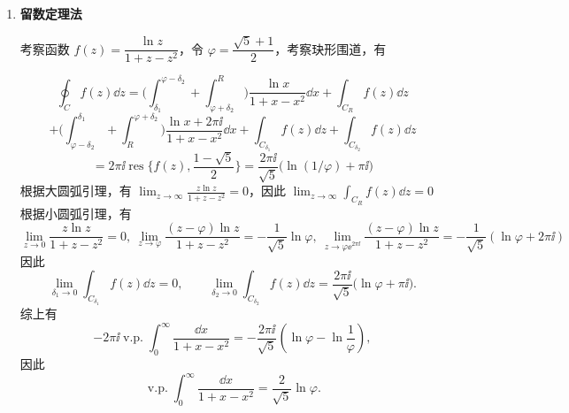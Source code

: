 \begin{question}
\begin{solution}
\begin{enumerate}
有 \(\displaystyle\lim_{z\to\infty} z f(z)=0,\ \lim_{z\to0} z f(z)=0\)，因此有 \[ \int_0^\infty \frac{x^m}{(x+a)(x+b)}\dd{x}=\frac{\pi}{\sin\pi m} \frac{a^m-b^m}{a-b} \]
最后可以得到 \[ \pdv{^2}{m^2}\int_0^\infty \frac{x^m}{(x+a)(x+b)}\dd{x}=\int_0^\infty \frac{(\ln x)^2 x^m}{(x+a)(x+b)}\dd{x} \] \[ =\frac{\pi\csc(m\pi)}{a-b} \biggl[(a^m - b^m) \pi^2 (\cot^2(m\pi) + \csc^2(m\pi)) \] \[ + a^m (\ln a)^2 - b^m (\ln b)^2 - 2\pi\cot(m\pi) (a^m \ln a - b^m \ln b)\biggr] \]
取 \(m\to0\)，有 \[ \int_0^\infty \frac{(\ln x)^2}{(x+a)(x+b)}\dd{x}=\frac{\pi^2 \ln\frac{b}{a}-(\ln a)^3+(\ln b)^3}{3(b-a)} \]

  \item
\textbf{留数定理法}\par

考察函数 \(f(z) = \dfrac{\ln z}{1+z-z^2}\)，令 \(\varphi=\dfrac{\sqrt5+1}{2}\)，考察玦形围道，有
\begin{center}
\end{center}

\[ \oint_C f(z)\dd{z} =\biggl(\int_{\delta_1}^{\varphi-\delta_2}+\int_{\varphi+\delta_2}^{R}\biggr) \frac{\ln x}{1+x-x^2}\dd{x} + \int_{C_R} f(z)\dd{z} \] \[ +\biggl(\int_{\varphi-\delta_2}^{\delta_1}+\int_{R}^{\varphi+\delta_2}\biggr) \frac{\ln x + 2\pi\ii}{1+x-x^2}\dd{x} +\int_{C_{\delta_1}} f(z)\dd{z} + \int_{C_{\delta_2}} f(z)\dd{z} \] \[ = 2\pi\ii \operatorname{res}\biggl\{f(z),\frac{1-\sqrt5}{2}\biggr\}= \frac{2\pi\ii}{\sqrt5} \bigl(\ln (1/\varphi)+\pi\ii\bigr) \]
根据大圆弧引理，有 \(\displaystyle\lim_{z\to\infty} \frac{z\ln z}{1+z-z^2}=0\)，因此 \(\displaystyle \lim_{z\to\infty} \int_{C_R} f(z)\dd{z}= 0\)
根据小圆弧引理，有 \[ \lim_{z\to0} \frac{z\ln z}{1+z-z^2}=0,\ \lim_{z\to\varphi} \frac{(z-\varphi)\ln z}{1+z-z^2}=-\frac1{\sqrt5}\ln\varphi,\ \lim_{z\to\varphi \ee^{2\pi\ii}} \frac{(z-\varphi)\ln z}{1+z-z^2}=-\frac{1}{\sqrt5}(\ln\varphi+2\pi\ii) \]
因此
\[
\lim_{\delta_1\to0}\int_{C_{\delta_1}}f(z)\dd{z}=0,
\qquad
\lim_{\delta_2\to0}\int_{C_{\delta_2}}f(z)\dd{z}
=\frac{2\pi\ii}{\sqrt5}\bigl(\ln\varphi+\pi\ii\bigr).
\]
综上有
\[
-2\pi\ii\operatorname{v.p.}\int_0^\infty\frac{\dd{x}}{1+x-x^2}
=-\frac{2\pi\ii}{\sqrt5}
\left(\ln\varphi-\ln\frac1\varphi\right),
\]
因此
\[
\operatorname{v.p.}\int_0^\infty\frac{\dd{x}}{1+x-x^2}
=\frac{2}{\sqrt5}\ln\varphi.
\]


\end{enumerate}
\end{solution}
\end{question}
